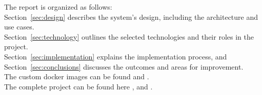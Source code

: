 The report is organized as follows: \\
Section~\ref{sec:design} describes the system's design, including the architecture and use cases. \\
Section~\ref{sec:technology} outlines the selected technologies and their roles in the project. \\
Section~\ref{sec:implementation} explains the implementation process, and Section~\ref{sec:conclusions} discusses the outcomes and areas for improvement.\\
\noindent
The custom docker images can be found \cite{noauthor_h598970dat250_api_nodate} and \cite{noauthor_h598970dat250_messaging_nodate}. \\
The complete project can be found here \cite{github_598975project-restapi_nodate}, \cite{github_thorbjorn2021project-messaging_nodate} and \cite{github_598975project-frontend_2024}.

